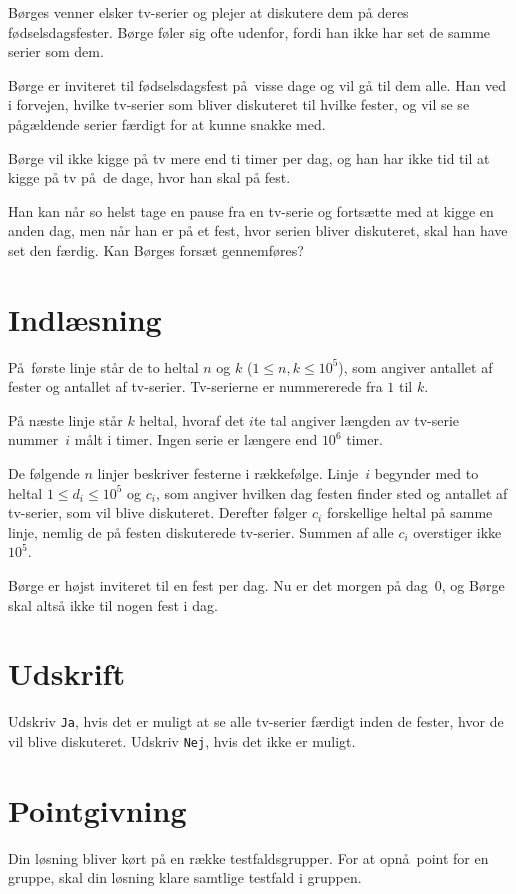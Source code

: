 Børges venner elsker tv-serier og plejer at diskutere dem på deres fødselsdagsfester.
Børge føler sig ofte udenfor, fordi han ikke har set de samme serier som dem.

Børge er inviteret til fødselsdagsfest på visse dage og vil gå til dem alle.
Han ved i forvejen, hvilke tv-serier som bliver diskuteret til hvilke fester, og vil se se pågældende serier færdigt for at kunne snakke med.

Børge vil ikke kigge på tv mere end ti timer per dag, og han har ikke tid til at kigge på tv på de dage, hvor han skal på fest.

Han kan når so helst tage en pause fra en tv-serie og fortsætte med at kigge en anden dag, men når han er på et fest, hvor serien bliver diskuteret, skal han have set den færdig.
Kan Børges forsæt gennemføres?

\section*{Indlæsning}
På første linje står de to heltal $n$ og $k$ ($1 \leq n,k \leq 10^5$), som angiver antallet af fester og antallet af tv-serier.
Tv-serierne er nummererede fra $1$ til $k$.

På næste linje står $k$ heltal, hvoraf det $i$te tal angiver længden av tv-serie nummer~$i$ målt i timer.
Ingen serie er længere end $10^6$ timer.

De følgende $n$ linjer beskriver festerne i rækkefølge.
Linje~$i$ begynder med to heltal $1 \leq d_i \leq 10^5$ og $c_i$, som angiver hvilken dag festen finder sted og antallet af tv-serier, som vil blive diskuteret.
Derefter følger $c_i$ forskellige heltal på samme linje, nemlig de på festen diskuterede tv-serier.
Summen af alle $c_i$ overstiger ikke $10^5$.

Børge er højst inviteret til en fest per dag. 
Nu er det morgen på dag~$0$,  og Børge skal altså ikke til nogen fest i dag.

\section*{Udskrift}
Udskriv \texttt{Ja}, hvis det er muligt at se alle tv-serier færdigt inden de fester, hvor de vil blive diskuteret.
Udskriv \texttt{Nej}, hvis det ikke er muligt.

\section*{Pointgivning}
Din løsning bliver kørt på en række testfaldsgrupper.
For at opnå point for en gruppe, skal din løsning klare samtlige testfald i gruppen.

